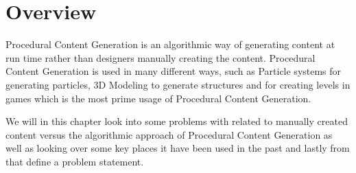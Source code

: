 \chapter{Overview}

Procedural Content Generation is an algorithmic way of generating content at run time rather than designers manually creating the content. Procedural Content Generation is used in many different ways, such as Particle systems for generating particles, 3D Modeling to generate structures and for creating levels in games which is the most prime usage of Procedural Content Generation.

We will in this chapter look into some problems with related to manually created content versus the algorithmic approach of Procedural Content Generation as well as looking over some key places it have been used in the past and lastly from that define a problem statement.